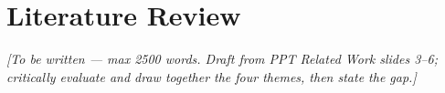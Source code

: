 \chapter{Literature Review}
\label{ch:literature}

\textit{[To be written — max 2500 words. Draft from PPT Related Work slides 3--6;
critically evaluate and draw together the four themes, then state the gap.]}
